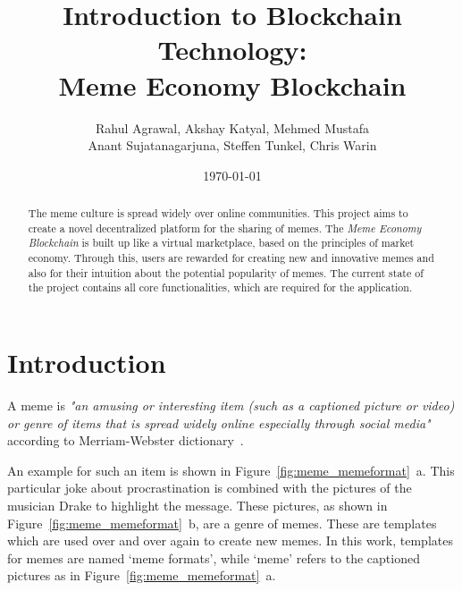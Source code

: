 \documentclass[12pt]{article}
\title{Introduction to Blockchain Technology:\\
    Meme Economy Blockchain}
\date{\today}
\author{Rahul Agrawal, Akshay Katyal, Mehmed Mustafa\\
Anant Sujatanagarjuna, Steffen Tunkel, Chris Warin}
\begin{document}
\maketitle
\thispagestyle{empty}
\begin{abstract}%
The meme culture is spread widely over online communities. This project aims to create a novel decentralized platform for the sharing of memes. The \textit{Meme Economy Blockchain} is built up like a virtual marketplace, based on the principles of market economy. Through this, users are rewarded for creating new and innovative memes and also for their intuition about the potential popularity of memes. The current state of the project contains all core functionalities, which are required for the application.


\end{abstract}

\newpage
\tableofcontents
\newpage




\section{Introduction} \label{sec:Intro}%


A meme is \textit{"an amusing or interesting item (such as a captioned picture or video) or genre of items that is spread widely online especially through social media"} according to Merriam-Webster dictionary~\cite{meme_def}.
    
    An example for such an item is shown in Figure~\ref{fig:meme_memeformat}~a. This particular joke about procrastination is combined with the pictures of the musician Drake to highlight the message. These pictures, as shown in Figure~\ref{fig:meme_memeformat}~b, are a genre of memes. These are templates which are used over and over again to create new memes. In this work, templates for memes are named `meme formats', while `meme' refers to the captioned pictures as in Figure~\ref{fig:meme_memeformat}~a.
\end{document}
